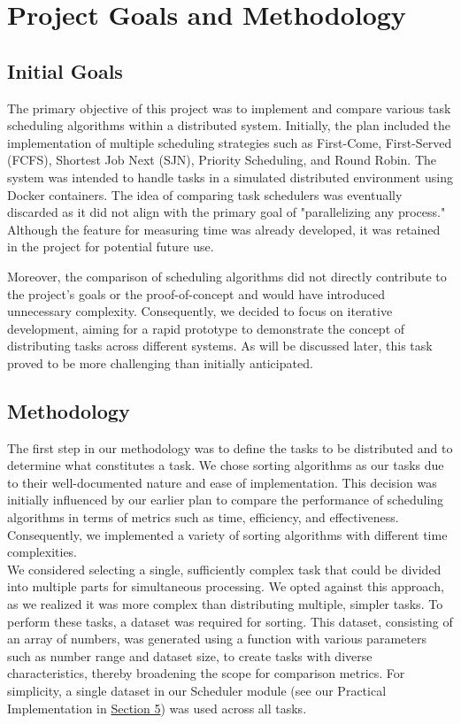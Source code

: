 \documentclass{article}
\begin{document}
\section{Project Goals and Methodology}
\subsection{Initial Goals}
The primary objective of this project was to implement and compare various task scheduling algorithms within a distributed system. Initially, the plan included the implementation of multiple scheduling strategies such as First-Come, First-Served (FCFS), Shortest Job Next (SJN), Priority Scheduling, and Round Robin. The system was intended to handle tasks in a simulated distributed environment using Docker containers. The idea of comparing task schedulers was eventually discarded as it did not align with the primary goal of "parallelizing any process." Although the feature for measuring time was already developed, it was retained in the project for potential future use.

Moreover, the comparison of scheduling algorithms did not directly contribute to the project's goals or the proof-of-concept and would have introduced unnecessary complexity. Consequently, we decided to focus on iterative development, aiming for a rapid prototype to demonstrate the concept of distributing tasks across different systems. As will be discussed later, this task proved to be more challenging than initially anticipated.

\subsection{Methodology}
The first step in our methodology was to define the tasks to be distributed and to determine what constitutes a task. We chose sorting algorithms as our tasks due to their well-documented nature and ease of implementation. This decision was initially influenced by our earlier plan to compare the performance of scheduling algorithms in terms of metrics such as time, efficiency, and effectiveness. Consequently, we implemented a variety of sorting algorithms with different time complexities.\\

We considered selecting a single, sufficiently complex task that could be divided into multiple parts for simultaneous processing. We opted against this approach, as we realized it was more complex than distributing multiple, simpler tasks. To perform these tasks, a dataset was required for sorting. This dataset, consisting of an array of numbers, was generated using a function with various parameters such as number range and dataset size, to create tasks with diverse characteristics, thereby broadening the scope for comparison metrics. For simplicity, a single dataset in our Scheduler module (see our Practical Implementation in \hyperref[sec:section5]{Section 5}) was used across all tasks.\\
\end{document}
